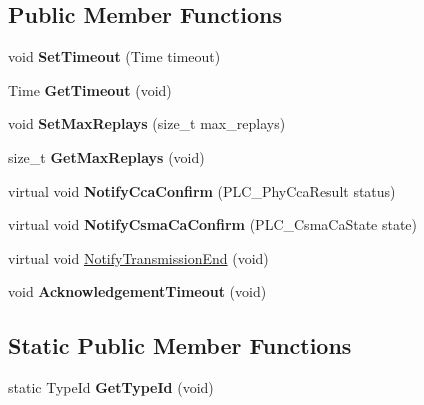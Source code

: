 \subsection*{\-Public \-Member \-Functions}
\begin{DoxyCompactItemize}
\item 
\hypertarget{classns3_1_1PLC__ArqMac_a9c87d1824eecd5db4bcef126e2ed0736}{void {\bfseries \-Set\-Timeout} (\-Time timeout)}\label{classns3_1_1PLC__ArqMac_a9c87d1824eecd5db4bcef126e2ed0736}

\item 
\hypertarget{classns3_1_1PLC__ArqMac_ac9dc2b68b0e67d5b5988adb2530472a5}{\-Time {\bfseries \-Get\-Timeout} (void)}\label{classns3_1_1PLC__ArqMac_ac9dc2b68b0e67d5b5988adb2530472a5}

\item 
\hypertarget{classns3_1_1PLC__ArqMac_a554c60629e3aa4a28c24139393e4b0bf}{void {\bfseries \-Set\-Max\-Replays} (size\-\_\-t max\-\_\-replays)}\label{classns3_1_1PLC__ArqMac_a554c60629e3aa4a28c24139393e4b0bf}

\item 
\hypertarget{classns3_1_1PLC__ArqMac_a4389129b4262638cfe68bb1b0305b5e3}{size\-\_\-t {\bfseries \-Get\-Max\-Replays} (void)}\label{classns3_1_1PLC__ArqMac_a4389129b4262638cfe68bb1b0305b5e3}

\item 
\hypertarget{classns3_1_1PLC__ArqMac_ab1ddbd6816eb1e36f9f270b50fc9afe1}{virtual void {\bfseries \-Notify\-Cca\-Confirm} (\-P\-L\-C\-\_\-\-Phy\-Cca\-Result status)}\label{classns3_1_1PLC__ArqMac_ab1ddbd6816eb1e36f9f270b50fc9afe1}

\item 
\hypertarget{classns3_1_1PLC__ArqMac_a18ceb1cd05a9fcb117133fb2135ecc4f}{virtual void {\bfseries \-Notify\-Csma\-Ca\-Confirm} (\-P\-L\-C\-\_\-\-Csma\-Ca\-State state)}\label{classns3_1_1PLC__ArqMac_a18ceb1cd05a9fcb117133fb2135ecc4f}

\item 
virtual void \hyperlink{classns3_1_1PLC__ArqMac_ac77a56684c784493baa9bb2fec7c5fb6}{\-Notify\-Transmission\-End} (void)
\item 
\hypertarget{classns3_1_1PLC__ArqMac_a2ffa9be47e82b676554e8d5bad031c98}{void {\bfseries \-Acknowledgement\-Timeout} (void)}\label{classns3_1_1PLC__ArqMac_a2ffa9be47e82b676554e8d5bad031c98}

\end{DoxyCompactItemize}
\subsection*{\-Static \-Public \-Member \-Functions}
\begin{DoxyCompactItemize}
\item 
\hypertarget{classns3_1_1PLC__ArqMac_ac656232a46edc7e48dd67c7c84b2e54b}{static \-Type\-Id {\bfseries \-Get\-Type\-Id} (void)}\label{classns3_1_1PLC__ArqMac_ac656232a46edc7e48dd67c7c84b2e54b}

\end{DoxyCompactItemize}


